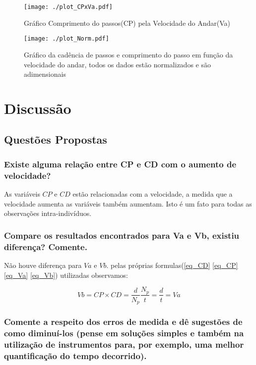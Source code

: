 \documentclass[a4paper,10pt]{article}
\begin{document}
\begin{figure}[h]

 \centering
 \texttt{[image: ./plot\_CPxVa.pdf]}
 \caption{Gráfico Comprimento do passos(CP) pela Velocidade do Andar(Va)}
 \label{plotCPxVa}
\end{figure}

\begin{figure}[h]
 \centering
 \texttt{[image: ./plot\_Norm.pdf]}
 \caption{Gráfico da cadência de passos e comprimento do passo em função da velocidade do andar, todos os dados estão normalizados e são adimensionais}
 \label{plotNorm}
\end{figure}


\FloatBarrier
\section{Discussão}
\subsection{Questões Propostas}
\subsubsection{Existe alguma relação entre CP e CD com o aumento de velocidade?}
As variáveis $CP$ e $CD$ estão relacionadas com a velocidade, a medida que a velocidade aumenta as variáveis também aumentam. Isto é um fato para todas as observações intra-indivíduos.

\subsubsection{Compare os resultados encontrados para Va e Vb, existiu diferença? Comente.}
Não houve diferença para $Va$ e $Vb$. pelas próprias formulas(\ref{eq_CD} \ref{eq_CP} \ref{eq_Va} \ref{eq_Vb}) utilizadas observamos:

\begin{equation}
   Vb = CP \times CD = \frac{d}{N_p} \frac{N_p}{t} = \frac{d}{t} = Va
\end{equation}

\subsubsection{Comente a respeito dos erros de medida e dê sugestões de como diminuí-los (pense em soluções simples e também na utilização de instrumentos para, por exemplo, uma melhor quantificação do tempo decorrido).}
\end{document}
